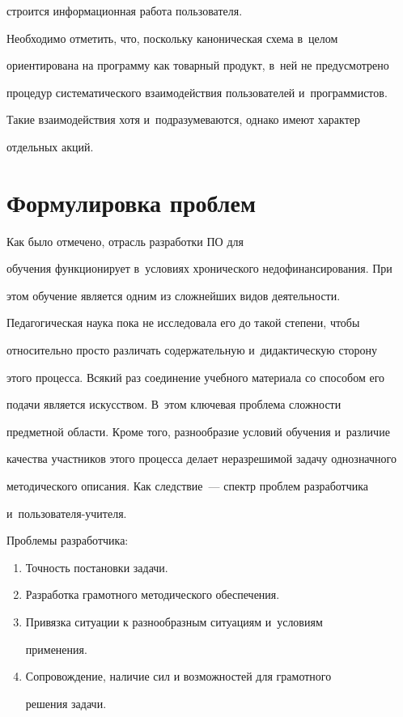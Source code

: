 строится информационная работа пользователя.



  Необходимо отметить, что, поскольку каноническая схема в~целом

ориентирована на программу как товарный продукт, в~ней не предусмотрено

процедур систематического взаимодействия пользователей и~программистов.

Такие взаимодействия хотя и~подразумеваются, однако имеют характер

отдельных акций.



  \section{Формулировка проблем}



  Как было отмечено, отрасль разработки ПО для

обучения функционирует в~условиях хронического недофинансирования. При

этом обучение является одним из сложнейших видов деятельности.

Педагогическая наука пока не исследовала его до такой степени, чтобы

относительно просто различать содержательную и~дидактическую сторону

этого процесса. Всякий раз соединение учебного материала со способом его

подачи является искусством. В~этом ключевая проблема сложности

предметной области. Кроме того, разнообразие условий обучения и~различие

качества участников этого процесса делает неразрешимой задачу однозначного

методического описания. Как следствие~--- спектр проблем разработчика

и~поль\-зо\-ва\-теля-учи\-теля.



  Проблемы разработчика:

  \begin{enumerate}[1.]

\item Точность постановки задачи.

\item Разработка грамотного методического обеспечения.

\item Привязка ситуации к разнообразным ситуациям и~условиям

применения.

\item Сопровождение, наличие сил и возможностей для грамотного

решения за\-дачи.

  \end{enumerate}



